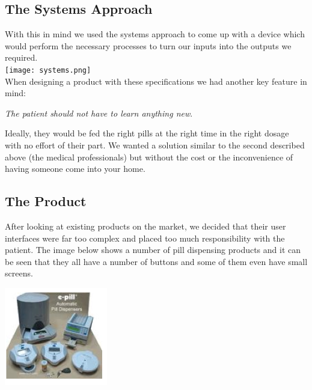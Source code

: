 \documentclass{article}
\begin{document}
	\subsection{The Systems Approach}
	With this in mind we used the systems approach to come up with a device which would perform the necessary processes to turn our inputs into the outputs we required. \bigskip \\ \texttt{[image: systems.png]} \bigskip \\
	When designing a product with these specifications we had another key feature in mind: \\
	\begin{center}\emph{The patient should not have to learn anything new}.
	\end{center}
	 \medskip Ideally, they would be fed the right pills at the right time in the right dosage with no effort of their part. We wanted a solution similar to the second described above (the medical professionals) but without the cost or the inconvenience of having someone come into your home.

	\subsection{The Product}
	After looking at existing products on the market, we decided that their user interfaces were far too complex and placed too much responsibility with the patient. The image below shows a number of pill dispensing products and it can be seen that they all have a number of buttons and some of them even have small screens.
	
	\begin{center}\includegraphics{pilld.png}\end{center}
	
\end{document}
